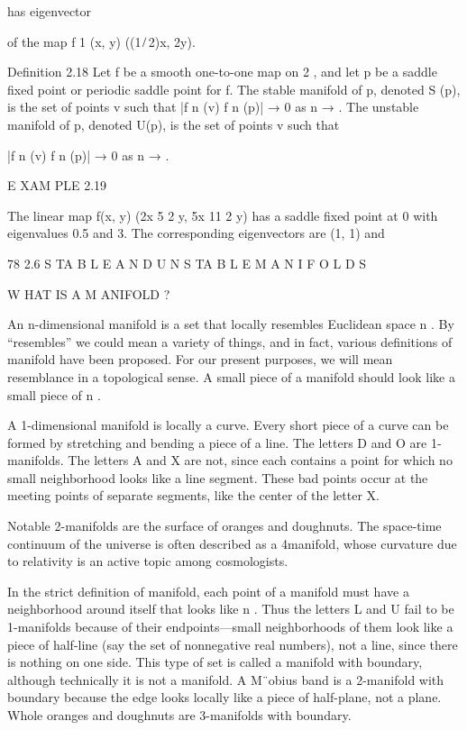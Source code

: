 \documentclass[12pt]{article}
\begin{document}
has eigenvector

of the map f 1 (x, y)  ((1 ̸ 2)x, 2y).

Deﬁnition 2.18 Let f be a smooth one-to-one map on  2 , and let p be a saddle ﬁxed point or periodic saddle point for f. The stable 
manifold of p, denoted S (p), is the set of points v such that |f n (v)  f n (p)| → 0 as n → . The unstable manifold of p, denoted 
U(p), is the set of points v such that

|f n (v)  f n (p)| → 0 as n → .

E XAM PLE 2.19

The linear map f(x, y)  (2x  5 2 y, 5x  11 2 y) has a saddle ﬁxed point at 0 with eigenvalues 0.5 and 3. The corresponding 
eigenvectors are (1, 1) and

78 2.6 S TA B L E A N D U N S TA B L E M A N I F O L D S

W HAT IS A M ANIFOLD ?

An n-dimensional manifold is a set that locally resembles Euclidean space  n . By “resembles” we could mean a variety of things, and 
in fact, various deﬁnitions of manifold have been proposed. For our present purposes, we will mean resemblance in a topological 
sense. A small piece of a manifold should look like a small piece of  n .

A 1-dimensional manifold is locally a curve. Every short piece of a curve can be formed by stretching and bending a piece of a line. 
The letters D and O are 1-manifolds. The letters A and X are not, since each contains a point for which no small neighborhood looks 
like a line segment. These bad points occur at the meeting points of separate segments, like the center of the letter X.

Notable 2-manifolds are the surface of oranges and doughnuts. The space-time continuum of the universe is often described as a 
4manifold, whose curvature due to relativity is an active topic among cosmologists.

In the strict deﬁnition of manifold, each point of a manifold must have a neighborhood around itself that looks like  n . Thus the 
letters L and U fail to be 1-manifolds because of their endpoints—small neighborhoods of them look like a piece of half-line (say the 
set of nonnegative real numbers), not a line, since there is nothing on one side. This type of set is called a manifold with 
boundary, although technically it is not a manifold. A M¨obius band is a 2-manifold with boundary because the edge looks locally like 
a piece of half-plane, not a plane. Whole oranges and doughnuts are 3-manifolds with boundary.
\end{document}
